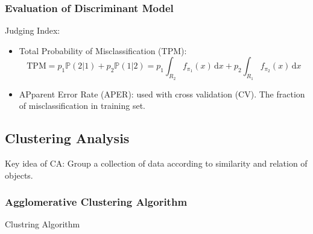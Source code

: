     
        
\subsubsection{Evaluation of Discriminant Model}
\begin{point}
    Judging Index:
\end{point}

\begin{itemize}[topsep=2pt,itemsep=2pt]
    \item Total Probability of Misclassification (TPM):
    \begin{equation}
        \mathrm{TPM}=p_1\mathbb{P}(2|1)+p_2\mathbb{P}(1|2)=p_1\int _{R_2}f_{\pi_1}(x) \,\mathrm{d}x+p_2\int _{R_1}f_{\pi_2}(x) \,\mathrm{d}x
    \end{equation}
    
    \item APparent Error Rate (APER): used with cross validation (CV). The fraction of misclassification in training set. 
    
\end{itemize}

    
    
    




\subsection{Clustering Analysis}\label{SubSectionClusteringAnalysis}
    Key idea of CA: Group a collection of data according to  similarity and relation of objects.

\subsubsection{Agglomerative Clustering Algorithm}

\begin{point}
    Clustring Algorithm
\end{point}

